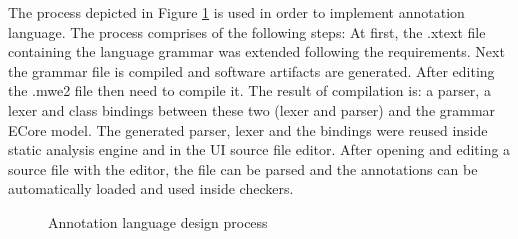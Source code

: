 The process depicted in Figure \ref{figure:Language_Design_Process} is used in order to
implement annotation language. The process 
comprises of the following steps: At first, the .xtext file
containing the language grammar was extended following the requirements. Next the grammar file is compiled and software artifacts are generated. After editing the .mwe2 file then need to compile it. The result of compilation is: a parser, a lexer and class bindings between these two (lexer and parser) and the grammar ECore model. The generated parser, lexer and the bindings were reused inside static analysis engine and in the UI source file editor. After opening and editing a source file with the editor, the file can be parsed and the annotations can be automatically loaded and used inside checkers.
\begin{figure}[htbp]
	\centering
	\vspace{-2em}
	\caption{Annotation language design process}
	\label{figure:Language_Design_Process}
\end{figure}